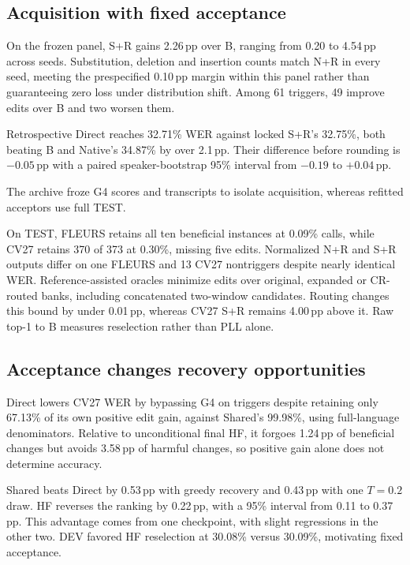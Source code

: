 \subsection{Acquisition with fixed acceptance}

On the frozen panel, S+R gains 2.26\,pp over B, ranging from 0.20 to 4.54\,pp across seeds. Substitution, deletion and insertion counts match N+R in every seed, meeting the prespecified 0.10\,pp margin within this panel rather than guaranteeing zero loss under distribution shift. Among 61 triggers, 49 improve edits over B and two worsen them.

\begin{samepage}
Retrospective Direct reaches 32.71\% WER against locked S+R's 32.75\%, both beating B and Native's 34.87\% by over 2.1\,pp. Their difference before rounding is $-0.05$\,pp with a paired speaker-bootstrap 95\% interval from $-0.19$ to $+0.04$\,pp.\par
\end{samepage}
The archive froze G4 scores and transcripts to isolate acquisition, whereas refitted acceptors use full TEST.

On TEST, FLEURS retains all ten beneficial instances at 0.09\% calls, while CV27 retains 370 of 373 at 0.30\%, missing five edits. Normalized N+R and S+R outputs differ on one FLEURS and 13 CV27 nontriggers despite nearly identical WER. Reference-assisted oracles minimize edits over original, expanded or CR-routed banks, including concatenated two-window candidates. Routing changes this bound by under 0.01\,pp, whereas CV27 S+R remains 4.00\,pp above it. Raw top-1 to B measures reselection rather than PLL alone.

\subsection{Acceptance changes recovery opportunities}
Direct lowers CV27 WER by bypassing G4 on triggers despite retaining only 67.13\% of its own positive edit gain, against Shared's 99.98\%, using full-language denominators. Relative to unconditional final HF, it forgoes 1.24\,pp of beneficial changes but avoids 3.58\,pp of harmful changes, so positive gain alone does not determine accuracy.

Shared beats Direct by 0.53\,pp with greedy recovery and 0.43\,pp with one $T=0.2$ draw. HF reverses the ranking by 0.22\,pp, with a 95\% interval from 0.11 to 0.37\,pp. This advantage comes from one checkpoint, with slight regressions in the other two. DEV favored HF reselection at 30.08\% versus 30.09\%, motivating fixed acceptance.

